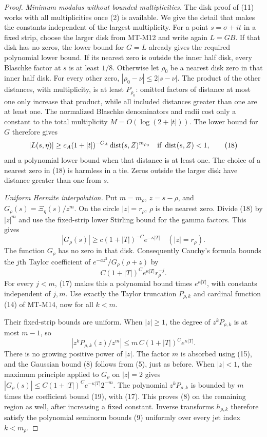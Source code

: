 \begin{proof}
\emph{Minimum modulus without bounded multiplicities.}
The disk proof of (11) works with all multiplicities once
(2) is available. We give the detail that makes the
constants independent of the largest multiplicity.
For a point $s=\sigma+it$ in a fixed strip, choose the
larger disk from MT-M12 and write again $L=GB$.
If that disk has no zeros, the lower bound for $G=L$
already gives the required polynomial lower bound.
If its nearest zero is outside the inner half disk,
every Blaschke factor at $s$ is at least $1/8$.
Otherwise let $\rho_0$ be a nearest disk zero in that
inner half disk. For every other zero,
$|\rho_0-\nu|\le2|s-\nu|$.
The product of the other distances, with multiplicity,
is at least $P_{\rho_0}$: omitted factors of distance
at most one only increase that product, while all
included distances greater than one are at least one.
The normalized Blaschke denominators and radii cost
only a constant to the total multiplicity
$M=O(\log(2+|t|))$. The lower bound for $G$ therefore
gives
\[
 |L(s,\eta)|\ge c_A(1+|t|)^{-C_A}
             \operatorname{dist}(s,Z)^{m_{\rho_0}}
                       \quad\hbox{if }\operatorname{dist}(s,Z)<1,
                                                               \tag{18}
\]
and a polynomial lower bound when that distance is
at least one. The choice of a nearest zero in (18)
is harmless in a tie. Zeros outside the larger disk
have distance greater than one from $s$.

\emph{Uniform Hermite interpolation.}
Put $m=m_\rho$, $z=s-\rho$, and
$G_\rho(s)=\Xi_\eta(s)/z^m$.
On the circle $|z|=r_\rho$, $\rho$ is the nearest zero.
Divide (18) by $|z|^m$ and use the fixed-strip lower
Stirling bound for the gamma factors. This gives
\[
             |G_\rho(s)|\ge
                 c(1+|T|)^{-C}e^{-\kappa|T|}
                            \quad(|z|=r_\rho).
\]
The function $G_\rho$ has no zero in that disk.
Consequently Cauchy's formula bounds the $j$th Taylor
coefficient of $e^{-az^2}/G_\rho(\rho+z)$ by
\[
       C(1+|T|)^C e^{\kappa|T|}r_\rho^{-j}.
                                                               \tag{19}
\]
For every $j<m$, (17) makes this a polynomial bound
times $e^{\kappa|T|}$, with constants independent of $j,m$.
Use exactly the Taylor truncation $P_{\rho,k}$ and
cardinal function (14) of MT-M14, now for all $k<m$.

Their fixed-strip bounds are uniform. When $|z|\ge1$,
the degree of $z^kP_{\rho,k}$ is at most $m-1$, so
\[
 |z^kP_{\rho,k}(z)/z^m|
       \le m\,C(1+|T|)^C e^{\kappa|T|}.
 \]
There is no growing positive power of $|z|$.
The factor $m$ is absorbed using (15), and the Gaussian
bound (8) follows from (5), just as before.
When $|z|<1$, the maximum principle applied to
$G_\rho$ on $|z|=2$ gives
$|G_\rho(s)|\le C(1+|T|)^C e^{-\kappa|T|}2^{-m}$.
The polynomial $z^kP_{\rho,k}$ is bounded by
$m$ times the coefficient bound (19), with (17).
This proves (8) on the remaining region as well,
after increasing a fixed constant.
Inverse transforms $h_{\rho,k}$ therefore satisfy
the polynomial seminorm bounds (9) uniformly over
every jet index $k<m_\rho$.


\end{proof}
